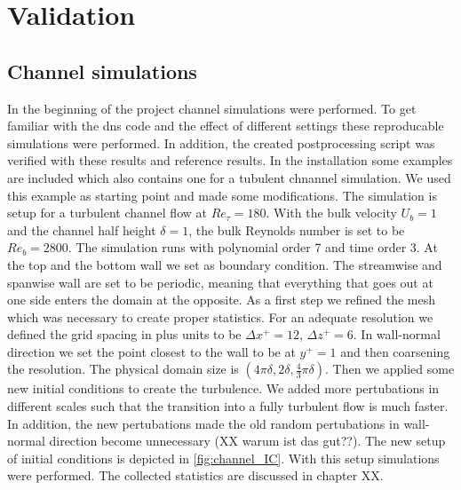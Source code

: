 \chapter{Validation} \label{chap:validation}

\section{Channel simulations}\label{sec:channel}
In the beginning of the project channel simulations were performed. 
To get familiar with the \acrshort{dns} code and the effect of different settings these reproducable simulations were performed.
In addition, the created postprocessing script was verified with these results and reference results.
In the  installation some examples are included which also contains one for a tubulent chnannel simulation.
We used this example as starting point and made some modifications.
The simulation is setup for a turbulent channel flow at $Re_\tau = 180$.
With the bulk velocity $U_b = 1$ and the channel half height $\delta = 1$, the bulk Reynolds number is set to be $Re_b = 2800$.
The simulation runs with polynomial order 7 and time order 3.
At the top and the bottom wall we set  as boundary condition.
The streamwise and spanwise wall are set to be periodic, meaning that everything that goes out at one side enters the domain at the opposite.
As a first step we refined the mesh which was necessary to create proper statistics.
For an adequate resolution we defined the grid spacing in plus units to be $\Delta x^+= 12$, $\Delta z^+= 6$. 
In wall-normal direction we set the point closest to the wall to be at $y^+ = 1$ and then coarsening the resolution.
The physical domain size is $(4\pi \delta, 2 \delta, \frac{4}{3}\pi \delta)$.
Then we applied some new initial conditions to create the turbulence.
We added more pertubations in different scales such that the transition into a fully turbulent flow is much faster.
In addition, the new pertubations made the old random pertubations in wall-normal direction become unnecessary (XX warum ist das gut??).
The new setup of initial conditions is depicted in \autoref{fig:channel_IC}.
With this setup simulations were performed.
The collected statistics are discussed in chapter XX.




